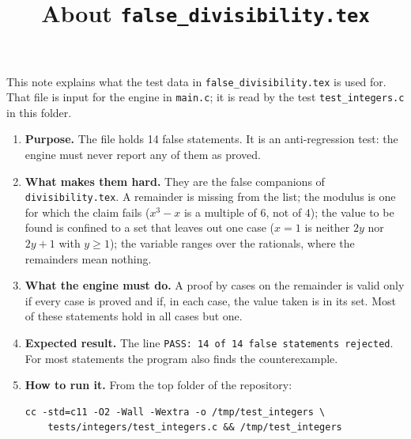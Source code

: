 \documentclass[11pt,a4paper]{article}
\title{About \texttt{false\_divisibility.tex}}
\author{}
\date{}
\begin{document}
\maketitle
This note explains what the test data in \texttt{false\_divisibility.tex} is used for. That file is input for the engine in \texttt{main.c}; it is read by the test \texttt{test\_integers.c} in this folder.

\begin{enumerate}
\item \textbf{Purpose.} The file holds 14 false statements. It is an anti-regression test: the engine must never report any of them as proved.

\item \textbf{What makes them hard.} They are the false companions of \texttt{divisibility.tex}. A remainder is missing from the list; the modulus is one for which the claim fails ($x^{3} - x$ is a multiple of $6$, not of $4$); the value to be found is confined to a set that leaves out one case ($x = 1$ is neither $2y$ nor $2y + 1$ with $y \ge 1$); the variable ranges over the rationals, where the remainders mean nothing.

\item \textbf{What the engine must do.} A proof by cases on the remainder is valid only if every case is proved and if, in each case, the value taken is in its set. Most of these statements hold in all cases but one.

\item \textbf{Expected result.} The line \texttt{PASS: 14 of 14 false statements rejected}. For most statements the program also finds the counterexample.

\item \textbf{How to run it.} From the top folder of the repository:
\begin{verbatim}
cc -std=c11 -O2 -Wall -Wextra -o /tmp/test_integers \
    tests/integers/test_integers.c && /tmp/test_integers
\end{verbatim}
\end{enumerate}
\end{document}

